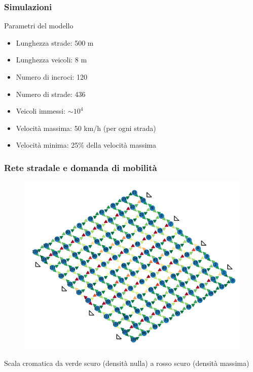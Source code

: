 \documentclass[11pt,]{beamer}
\begin{document}
\begin{frame}
	\frametitle{Simulazioni} %
	
		\begin{block}{Parametri del modello}
			\begin{itemize}
				\item Lunghezza strade: 500 m
				\item Lunghezza veicoli: 8 m
				\item Numero di incroci: 120
				\item Numero di strade: 436
				\item Veicoli immessi: $\sim 10^4$
				\item Velocit\`a massima: 50 km/h (per ogni strada)
				\item Velocit\`a minima: 25\% della velocit\`a massima
			\end{itemize}
			
		\end{block}	
\end{frame}

\begin{frame}
	\frametitle{Rete stradale e domanda di mobilit\`a} %
	\centering
	\begin{figure}
		\includegraphics[width=.75\textwidth]{example.png}
	\end{figure}
	\scriptsize
	Scala cromatica da verde scuro (densit\`a nulla) a rosso scuro (densit\`a massima)
\end{frame}
\end{document}
